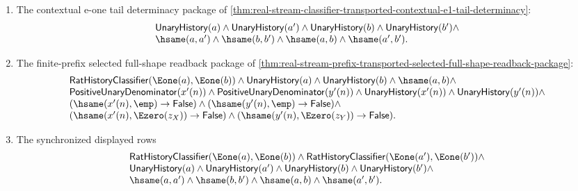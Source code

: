 \begin{theorem}
\begin{enumerate}
$$\begin{array}{l}
(\hsame(o_X(n),\emp)\to\mathsf{False})\land
(\hsame(o_Y(n),\emp)\to\mathsf{False}),\\
(\hsame(o_X(n),\Ezero(z_X))\to\mathsf{False})\land
(\hsame(o_Y(n),\Ezero(z_Y))\to\mathsf{False}),\\
\mathsf{UnaryHistory}(a)\land\mathsf{UnaryHistory}(b)\land\hsame(a,b).
\end{array}
$$
\item The contextual e-one tail determinacy package of
\autoref{thm:real-stream-classifier-transported-contextual-e1-tail-determinacy}:
$$
\begin{array}{l}
\mathsf{UnaryHistory}(a)\land
\mathsf{UnaryHistory}(a')\land
\mathsf{UnaryHistory}(b)\land
\mathsf{UnaryHistory}(b')\land\\
\hsame(a,a')\land
\hsame(b,b')\land
\hsame(a,b)\land
\hsame(a',b').
\end{array}
$$
\item The finite-prefix selected full-shape readback package of
\autoref{thm:real-stream-prefix-transported-selected-full-shape-readback-package}:
$$
\begin{array}{l}
\mathsf{RatHistoryClassifier}(\Eone(a),\Eone(b))\land
\mathsf{UnaryHistory}(a)\land \mathsf{UnaryHistory}(b)\land \hsame(a,b)\land\\
\mathsf{PositiveUnaryDenominator}(x'(n))\land
\mathsf{PositiveUnaryDenominator}(y'(n))\land
\mathsf{UnaryHistory}(x'(n))\land
\mathsf{UnaryHistory}(y'(n))\land\\
(\hsame(x'(n),\emp)\to\mathsf{False})\land
(\hsame(y'(n),\emp)\to\mathsf{False})\land\\
(\hsame(x'(n),\Ezero(z_X))\to\mathsf{False})\land
(\hsame(y'(n),\Ezero(z_Y))\to\mathsf{False}).
\end{array}
$$
\item The synchronized displayed rows
$$
\begin{array}{l}
\mathsf{RatHistoryClassifier}(\Eone(a),\Eone(b))\land
\mathsf{RatHistoryClassifier}(\Eone(a'),\Eone(b'))\land\\
\mathsf{UnaryHistory}(a)\land
\mathsf{UnaryHistory}(a')\land
\mathsf{UnaryHistory}(b)\land
\mathsf{UnaryHistory}(b')\land\\
\hsame(a,a')\land
\hsame(b,b')\land
\hsame(a,b)\land
\hsame(a',b').
\end{array}
$$
\end{enumerate}
\end{theorem}
